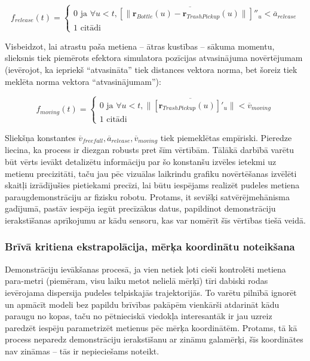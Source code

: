 \documentclass[12pt, a4paper]{article}
\numberwithin{equation}{section} %
\begin{document}
\begin{equation}
    f_{release} (t) = \begin{cases}
        0 \text{ ja } \forall u < t, \overline{ \left [ \lVert  \boldsymbol{r}_{Bottle}(u) -  \boldsymbol{r}_{TrashPickup}(u)  \rVert \right ] ''_u} < \overline{a}_{release} \\
        1 \text{ citādi }
    \end{cases}
\end{equation}

Visbeidzot, lai atrastu paša metiena -- ātras kustības -- sākuma momentu, slieksnis tiek piemērots efektora simulatora pozīcijas atvasinājuma novērtējumam (ievērojot, ka iepriekš ``atvasināta'' tiek distances vektora norma, bet šoreiz tiek meklēta norma vektora ``atvasinājumam''):

\begin{equation}
    f_{moving} (t) = \begin{cases}
        0 \text{ ja } \forall u < t,  \lVert \overline{\left [  \boldsymbol{r}_{TrashPickup}(u) \right ]'_u} \rVert  < \overline{v}_{moving} \\
        1 \text{ citādi }
    \end{cases}
\end{equation}

Sliekšņa konstantes $\overline{v}_{freefall}, \overline{a}_{release}, \overline{v}_{moving}$ tiek piemeklētas empīriski. Pieredze liecina, ka process ir diezgan robusts pret šīm vērtībām. Tālākā darbībā varētu būt vērts ievākt detalizētu informāciju par šo konstanšu izvēles ietekmi uz metienu precizitāti, taču jau pēc vizuālas laikrindu grafiku novērtēšanas izvēlēti skaitļi izrādījušies pietiekami precīzi, lai būtu iespējams realizēt pudeles metiena paraugdemonstrāciju ar fizisku robotu. Protams, it sevišķi satvērējmehānisma gadījumā, pastāv iespēja iegūt precīzākus datus, papildinot demonstrāciju ierakstīšanas aprīkojumu ar kādu sensoru, kas var nomērīt šīs vērtības tiešā veidā.

\subsubsection{Brīvā kritiena ekstrapolācija, mērķa koordinātu noteikšana}

Demonstrāciju ievākšanas procesā, ja vien netiek ļoti cieši kontrolēti metiena para-metri (piemēram, visu laiku metot nelielā mērķī) tīri dabiski rodas ievērojama dispersija pudeles telpiskajās trajektorijās. To varētu pilnībā ignorēt un apmācīt modeli bez papildu brīvības pakāpēm vienkārši atdarināt kādu paraugu no kopas, taču no pētnieciskā viedokļa interesantāk ir jau uzreiz paredzēt iespēju parametrizēt metienus pēc mērķa koordinātēm. Protams, tā kā process neparedz demonstrāciju ierakstīšanu ar zināmu galamērķi, šīs koordinātes nav zināmas -- tās ir nepieciešams noteikt.
\end{document}
